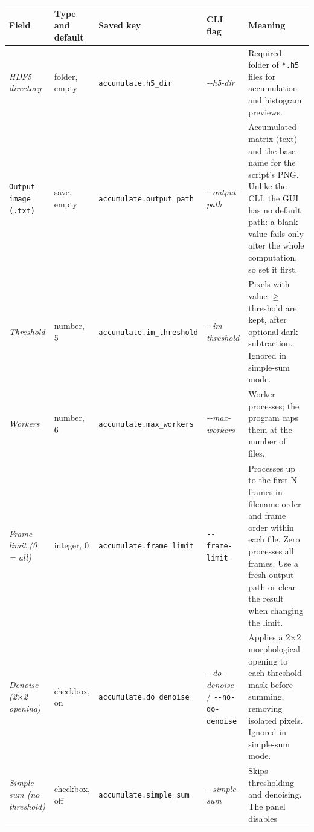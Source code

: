\documentclass[11pt,a4paper]{article}
\newcommand{\code}[1]{\texttt{#1}}
\begin{document}
\begin{center}
\footnotesize
\begin{longtable}{@{}L{3.4cm}L{2.3cm}L{2.5cm}L{2.8cm}L{4.9cm}@{}}
\toprule
Field & Type and default & Saved key & CLI flag & Meaning \\
\midrule
\endhead
\bottomrule
\endfoot
\emph{HDF5 directory} & folder, empty & \code{accumulate.\allowbreak{}h5\_\allowbreak{}dir} &
\emph{-\allowbreak{}-\allowbreak{}h5-\allowbreak{}dir} & Required folder of \code{*.\allowbreak{}h5} files for accumulation
and histogram previews. \\
\addlinespace
\code{Output image (.txt)} & save, empty & \code{accumulate.\allowbreak{}output\_\allowbreak{}path} &
\emph{-\allowbreak{}-\allowbreak{}output-\allowbreak{}path} & Accumulated matrix (text) and the base name for the
script's PNG. Unlike the CLI, the GUI has no default path: a blank value
fails only after the whole computation, so set it first. \\
\addlinespace
\emph{Threshold} & number, 5 & \code{accumulate.\allowbreak{}im\_\allowbreak{}threshold} &
\emph{-\allowbreak{}-\allowbreak{}im-\allowbreak{}threshold} & Pixels with value $\ge$ threshold are kept, after
optional dark subtraction. Ignored in simple-sum mode. \\
\addlinespace
\emph{Workers} & number, 6 & \code{accumulate.\allowbreak{}max\_\allowbreak{}workers} &
\emph{-\allowbreak{}-\allowbreak{}max-\allowbreak{}workers} & Worker processes; the program caps them at the number
of files. \\
\addlinespace
\emph{Frame limit (0 = all)} & integer, 0 & \code{accumulate.\allowbreak{}frame\_\allowbreak{}limit} &
\code{-\allowbreak{}-\allowbreak{}frame-\allowbreak{}limit} & Processes up to the first N frames in filename
order and frame order within each file. Zero processes all frames.
Use a fresh output path or clear the result when changing the limit. \\
\addlinespace
\emph{Denoise (2$\times$2 opening)} & checkbox, on & \code{accumulate.\allowbreak{}do\_\allowbreak{}denoise} &
\emph{-\allowbreak{}-\allowbreak{}do-\allowbreak{}denoise} / \code{-\allowbreak{}-\allowbreak{}no-\allowbreak{}do-\allowbreak{}denoise} & Applies a 2$\times$2 morphological
opening to each threshold mask before summing, removing isolated pixels.
Ignored in simple-sum mode. \\
\addlinespace
\emph{Simple sum (no threshold)} & checkbox, off & \code{accumulate.\allowbreak{}simple\_\allowbreak{}sum} &
\emph{-\allowbreak{}-\allowbreak{}simple-\allowbreak{}sum} & Skips thresholding and denoising. The panel disables

\end{longtable}
\end{center}
\end{document}
